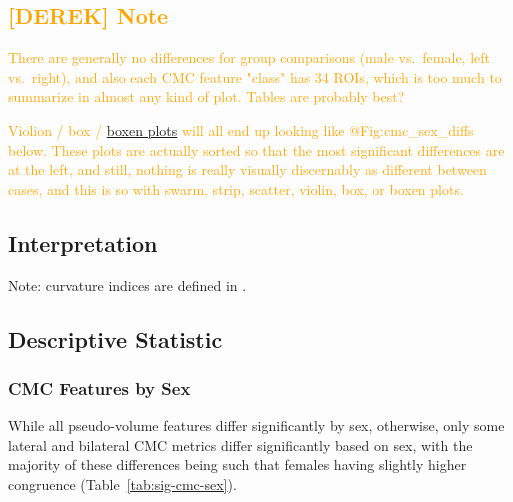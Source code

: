 \documentclass{article}
\begin{document}
\textcolor{orange}{\subsection{[DEREK] Note}}

\textcolor{orange}{There are generally no differences for group comparisons
(male vs.\ female, left vs.\ right), and also each CMC feature "class" has 34
ROIs, which is too much to summarize in almost any kind of plot. Tables are
probably best?}


\textcolor{orange}{Violion / box /
\href{https://seaborn.pydata.org/generated/seaborn.boxenplot.html}{boxen
plots} will all end up looking like @Fig:cmc\_sex\_diffs below. These plots
are actually sorted so that the most significant differences are at the left,
and still, nothing is really visually discernably as different between cases,
and this is so with swarm, strip, scatter, violin, box, or boxen plots.}

\subsection{Interpretation}

Note: curvature indices are defined in \citep{vanessenStructuralFunctionalAnalyses1997}.


\subsection{Descriptive Statistic}

\subsubsection{CMC Features by Sex}

While all pseudo-volume features differ significantly by sex, otherwise,
only some lateral and bilateral CMC metrics differ significantly based on
sex, with the majority of these differences being such that females having
slightly higher congruence (Table~\ref{tab:sig-cmc-sex}).
\end{document}
